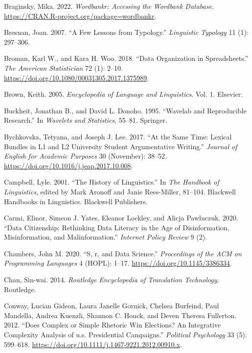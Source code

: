\documentclass[
  letterpaper,
  DIV=11,
  numbers=noendperiod]{scrreport}
\newlength{\cslhangindent}
\newlength{\cslentryspacingunit} %
\newenvironment{CSLReferences}[2] %
 {%
  \setlength{\parindent}{0pt}
  \ifodd #1
  \let\oldpar\par
  \def\par{\hangindent=\cslhangindent\oldpar}
  \fi
  \setlength{\parskip}{#2\cslentryspacingunit}
 }%
 {}
\theoremstyle{definition}
\theoremstyle{remark}
\begin{document}
\begin{CSLReferences}{1}{0}
\leavevmode{}%
Braginsky, Mika. 2022. \emph{Wordbankr: Accessing the Wordbank
Database}. \url{https://CRAN.R-project.org/package=wordbankr}.

\leavevmode{}%
Bresnan, Joan. 2007. {``A Few Lessons from Typology.''} \emph{Linguistic
Typology} 11 (1): 297--306.

\leavevmode{}%
Broman, Karl W., and Kara H. Woo. 2018. {``Data Organization in
Spreadsheets.''} \emph{The American Statistician} 72 (1): 2--10.
\url{https://doi.org/10.1080/00031305.2017.1375989}.

\leavevmode{}%
Brown, Keith. 2005. \emph{Encyclopedia of Language and Linguistics}.
Vol. 1. Elsevier.

\leavevmode{}%
Buckheit, Jonathan B., and David L. Donoho. 1995. {``Wavelab and
Reproducible Research.''} In \emph{Wavelets and Statistics}, 55--81.
Springer.

\leavevmode{}%
Bychkovska, Tetyana, and Joseph J. Lee. 2017. {``At the Same Time:
Lexical Bundles in L1 and L2 University Student Argumentative
Writing.''} \emph{Journal of English for Academic Purposes} 30
(November): 38--52. \url{https://doi.org/10.1016/j.jeap.2017.10.008}.

\leavevmode{}%
Campbell, Lyle. 2001. {``The History of Linguistics.''} In \emph{The
Handbook of Linguistics}, edited by Mark Aronoff and Janie Rees-Miller,
81--104. Blackwell Handbooks in Linguistics. Blackwell Publishers.

\leavevmode{}%
Carmi, Elinor, Simeon J. Yates, Eleanor Lockley, and Alicja Pawluczuk.
2020. {``Data Citizenship: Rethinking Data Literacy in the Age of
Disinformation, Misinformation, and Malinformation.''} \emph{Internet
Policy Review} 9 (2).

\leavevmode{}%
Chambers, John M. 2020. {``S, r, and Data Science.''} \emph{Proceedings
of the ACM on Programming Languages} 4 (HOPL): 1--17.
\url{https://doi.org/10.1145/3386334}.

\leavevmode{}%
Chan, Sin-wai. 2014. \emph{Routledge Encyclopedia of Translation
Technology}. Routledge.

\leavevmode{}%
Conway, Lucian Gideon, Laura Janelle Gornick, Chelsea Burfeind, Paul
Mandella, Andrea Kuenzli, Shannon C. Houck, and Deven Theresa Fullerton.
2012. {``Does Complex or Simple Rhetoric Win Elections? An Integrative
Complexity Analysis of u.s. Presidential Campaigns.''} \emph{Political
Psychology} 33 (5): 599--618.
\url{https://doi.org/10.1111/j.1467-9221.2012.00910.x}.


\end{CSLReferences}
\end{document}
